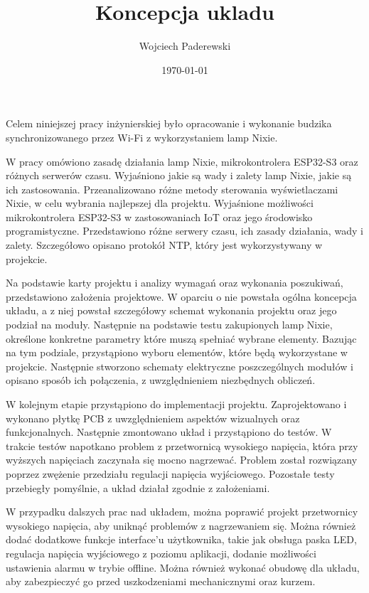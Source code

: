 \documentclass[../main.tex]{subfiles}
\author{Wojciech Paderewski}
\date{\today}
\title{Koncepcja ukladu}
\begin{document}
Celem niniejszej pracy inżynierskiej było opracowanie i wykonanie budzika synchronizowanego przez Wi-Fi z wykorzystaniem lamp Nixie.

W pracy omówiono zasadę działania lamp Nixie, mikrokontrolera ESP32-S3 oraz różnych serwerów czasu.
Wyjaśniono jakie są wady i zalety lamp Nixie, jakie są ich zastosowania. Przeanalizowano różne metody sterowania wyświetlaczami Nixie, w celu wybrania najlepszej dla projektu.
Wyjaśnione możliwości mikrokontrolera ESP32-S3 w zastosowaniach IoT oraz jego środowisko programistyczne.
Przedstawiono różne serwery czasu, ich zasady działania, wady i zalety. Szczegółowo opisano protokół NTP, który jest wykorzystywany w projekcie.

Na podstawie karty projektu i analizy wymagań oraz wykonania poszukiwań, przedstawiono założenia projektowe. W oparciu o nie powstała ogólna koncepcja układu,
a z niej powstał szczegółowy schemat wykonania projektu oraz jego podział na moduły. Następnie na podstawie testu zakupionych lamp Nixie, określone konkretne parametry które muszą spełniać wybrane elementy.
Bazując na tym podziale, przystąpiono wyboru elementów, które będą wykorzystane w projekcie. Następnie stworzono schematy elektryczne poszczególnych modułów i opisano sposób ich połączenia, z uwzględnieniem niezbędnych obliczeń.

W kolejnym etapie przystąpiono do implementacji projektu. Zaprojektowano i wykonano płytkę PCB z uwzględnieniem aspektów wizualnych oraz funkcjonalnych. Następnie zmontowano układ i przystąpiono do testów.
W trakcie testów napotkano problem z przetwornicą wysokiego napięcia, która przy wyższych napięciach zaczynała się mocno nagrzewać. Problem został rozwiązany poprzez zwężenie przedziału regulacji napięcia wyjściowego.
Pozostałe testy przebiegły pomyślnie, a układ działał zgodnie z założeniami.

W przypadku dalszych prac nad układem, można poprawić projekt przetwornicy wysokiego napięcia, aby uniknąć problemów z nagrzewaniem się. Można również dodać dodatkowe funkcje interface'u użytkownika, 
takie jak obsługa paska LED, regulacja napięcia wyjściowego z poziomu aplikacji, dodanie możliwości ustawienia alarmu w trybie offline. Można również wykonać obudowę dla układu,
aby zabezpieczyć go przed uszkodzeniami mechanicznymi oraz kurzem.
\end{document}
